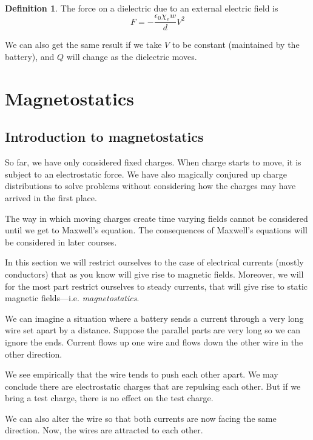 \documentclass[12pt,chapterprefix=false,dvipsnames]{scrbook}
\theoremstyle{dotless}
\theoremstyle{definition}
\newtheorem{protodefinition}{Definition}[section]
\newenvironment{definition}
{\colorlet{shadecolor}{black!15}\begin{shaded}\begin{protodefinition}}
			{\end{protodefinition}\end{shaded}}
\begin{document}
\begin{definition}
	The force on a dielectric due to an external electric field is
	\begin{equation}
		F =  -\frac{\epsilon_{0} \chi_e w}{d}V^2
	\end{equation}
\end{definition}

We can also get the same result if we take
$V$ to be constant (maintained by the
battery), and $Q$ will change as the
dielectric moves.

\chapter{Magnetostatics}%
\label{cha:magnetostatics}

\section{Introduction to magnetostatics}%
\label{sec:introduction_to_magnetostatics}

So far, we have only considered fixed charges. When charge
starts to move, it is subject to an electrostatic force. We have
also magically conjured up charge distributions to solve
problems without considering how the charges may have arrived in
the first place.

The way in which moving charges create time varying fields
cannot be considered until we get to Maxwell's equation. The
consequences of Maxwell's equations will be considered in later
courses.

In this section we will restrict ourselves to the case of
electrical currents (mostly conductors) that as you know will
give rise to magnetic fields. Moreover, we will for the most
part restrict ourselves to steady currents, that will give rise
to static magnetic fields---i.e. \textit{magnetostatics}.

We can imagine a situation where a battery sends a current
through a very long wire set apart by a distance. Suppose the
parallel parts are very long so we can ignore the ends. Current
flows up one wire and flows down the other wire in the other
direction.

We see empirically that the wire tends to push each other apart.
We may conclude there are electrostatic charges that are
repulsing each other. But if we bring a test charge, there is no
effect on the test charge.

We can also alter the wire so that both currents are now facing
the same direction. Now, the wires are attracted to each other.
\end{document}
